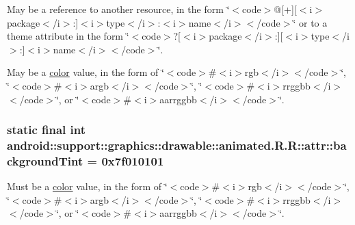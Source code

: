 May be a reference to another resource, in the form \char`\"{}$<$code$>$@\mbox{[}+\mbox{]}\mbox{[}$<$i$>$package$<$/i$>$:\mbox{]}$<$i$>$type$<$/i$>$:$<$i$>$name$<$/i$>$$<$/code$>$\char`\"{} or to a theme attribute in the form \char`\"{}$<$code$>$?\mbox{[}$<$i$>$package$<$/i$>$:\mbox{]}\mbox{[}$<$i$>$type$<$/i$>$:\mbox{]}$<$i$>$name$<$/i$>$$<$/code$>$\char`\"{}. 

May be a \hyperlink{classandroid_1_1support_1_1graphics_1_1drawable_1_1animated_1_1_r_1_1color}{color} value, in the form of \char`\"{}$<$code$>$\#$<$i$>$rgb$<$/i$>$$<$/code$>$\char`\"{}, \char`\"{}$<$code$>$\#$<$i$>$argb$<$/i$>$$<$/code$>$\char`\"{}, \char`\"{}$<$code$>$\#$<$i$>$rrggbb$<$/i$>$$<$/code$>$\char`\"{}, or \char`\"{}$<$code$>$\#$<$i$>$aarrggbb$<$/i$>$$<$/code$>$\char`\"{}. \hypertarget{classandroid_1_1support_1_1graphics_1_1drawable_1_1animated_1_1_r_1_1attr_d3798f86247e99913b5a16af3da43b0b}{
\subsubsection[{backgroundTint}]{\setlength{\rightskip}{0pt plus 5cm}static final int android::support::graphics::drawable::animated.R.R::attr::backgroundTint = 0x7f010101}}
\label{classandroid_1_1support_1_1graphics_1_1drawable_1_1animated_1_1_r_1_1attr_d3798f86247e99913b5a16af3da43b0b}


Must be a \hyperlink{classandroid_1_1support_1_1graphics_1_1drawable_1_1animated_1_1_r_1_1color}{color} value, in the form of \char`\"{}$<$code$>$\#$<$i$>$rgb$<$/i$>$$<$/code$>$\char`\"{}, \char`\"{}$<$code$>$\#$<$i$>$argb$<$/i$>$$<$/code$>$\char`\"{}, \char`\"{}$<$code$>$\#$<$i$>$rrggbb$<$/i$>$$<$/code$>$\char`\"{}, or \char`\"{}$<$code$>$\#$<$i$>$aarrggbb$<$/i$>$$<$/code$>$\char`\"{}. 

